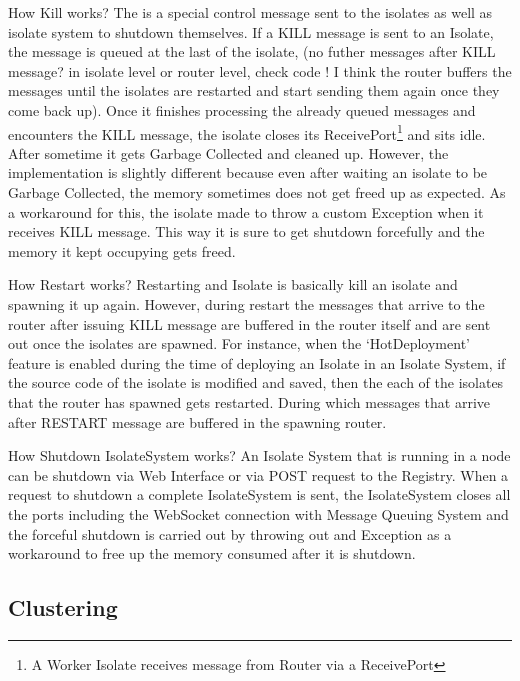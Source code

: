 \begin{description}
    \item How Kill works?
    The is a special control message sent to the isolates as well as isolate system to shutdown themselves. If a KILL message is sent to an Isolate, the message is queued at the last of the isolate, (no futher messages after KILL message? in isolate level or router level, check code ! I think the router buffers the messages until the isolates are restarted and start sending them again once they come back up). Once it finishes processing the already queued messages and encounters the KILL message, the isolate closes its ReceivePort\footnote{A Worker Isolate receives message from Router via a ReceivePort} and sits idle. After sometime it gets Garbage Collected and cleaned up. However, the implementation is slightly different because even after waiting an isolate to be Garbage Collected, the memory sometimes does not get freed up as expected. As a workaround for this, the isolate made to throw a custom Exception when it receives KILL message. This way it is sure to get shutdown forcefully and the memory it kept occupying gets freed.

    \item How Restart works?
    Restarting and Isolate is basically kill an isolate and spawning it up again. However, during restart the messages that arrive to the router after issuing KILL message are buffered in the router itself and are sent out once the isolates are spawned. For instance, when the ‘HotDeployment’ feature is enabled during the time of deploying an Isolate in an Isolate System, if the source code of the isolate is modified and saved, then the each of the isolates that the router has spawned gets restarted. During which messages that arrive after RESTART message are buffered in the spawning router.

    \item How Shutdown IsolateSystem works?
    An Isolate System that is running in a node can be shutdown via Web Interface or via POST request to the Registry. When a request to shutdown a complete IsolateSystem is sent, the IsolateSystem closes all the ports including the WebSocket connection with Message Queuing System and the forceful shutdown is carried out by throwing out and Exception as a workaround to free up the memory consumed after it is shutdown.

  \end{description}
\subsection{Clustering}


